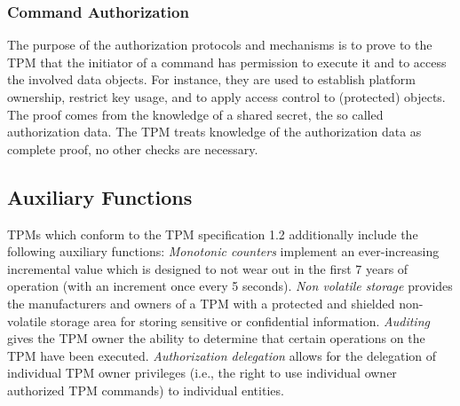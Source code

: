\documentclass[11pt,letterpaper]{article}
\begin{document}
\subsubsection{Command Authorization}
The purpose of the authorization protocols and mechanisms is to prove to the TPM that the
initiator of a command has permission to execute it and to access the involved data objects.
For instance, they are used to establish platform ownership, restrict key usage, and to
apply access control to (protected) objects. The proof comes from the knowledge of a shared
secret, the so called authorization data. The TPM treats knowledge of the authorization data
as complete proof, no other checks are necessary.

%

\subsection{Auxiliary Functions}
TPMs which conform to the TPM specification 1.2 additionally include the following auxiliary
functions: \emph{Monotonic counters} implement an ever-increasing incremental value which is
designed to not wear out in the first 7 years of operation (with an increment once every 5 seconds).
\emph{Non volatile storage} provides the manufacturers and owners of a TPM with a protected and
shielded non-volatile storage area for storing sensitive or confidential information.
\emph{Auditing} gives the TPM owner the ability to determine that certain operations on the TPM
have been executed. \emph{Authorization delegation} allows for the delegation of individual TPM
owner privileges (i.e., the right to use individual owner authorized TPM commands) to individual
entities.
\end{document}
